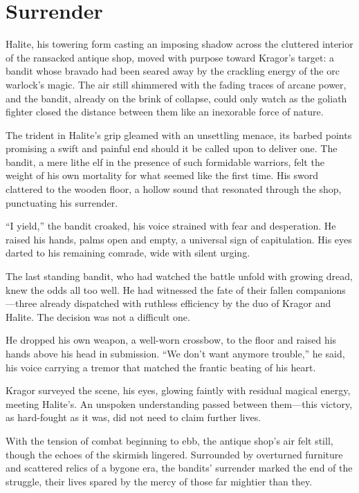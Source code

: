 \documentclass[
  12pt,twoside,twocolumn,openany,nodeprecatedcode]{dndbook}
\begin{document}
\section{Surrender}\label{surrender}

Halite, his towering form casting an imposing shadow across the
cluttered interior of the ransacked antique shop, moved with purpose
toward Kragor's target: a bandit whose bravado had been seared away by
the crackling energy of the orc warlock's magic. The air still shimmered
with the fading traces of arcane power, and the bandit, already on the
brink of collapse, could only watch as the goliath fighter closed the
distance between them like an inexorable force of nature.

The trident in Halite's grip gleamed with an unsettling menace, its
barbed points promising a swift and painful end should it be called upon
to deliver one. The bandit, a mere lithe elf in the presence of such
formidable warriors, felt the weight of his own mortality for what
seemed like the first time. His sword clattered to the wooden floor, a
hollow sound that resonated through the shop, punctuating his surrender.

``I yield,'' the bandit croaked, his voice strained with fear and
desperation. He raised his hands, palms open and empty, a universal sign
of capitulation. His eyes darted to his remaining comrade, wide with
silent urging.

The last standing bandit, who had watched the battle unfold with growing
dread, knew the odds all too well. He had witnessed the fate of their
fallen companions---three already dispatched with ruthless efficiency by
the duo of Kragor and Halite. The decision was not a difficult one.

He dropped his own weapon, a well-worn crossbow, to the floor and raised
his hands above his head in submission. ``We don't want anymore
trouble,'' he said, his voice carrying a tremor that matched the frantic
beating of his heart.

Kragor surveyed the scene, his eyes, glowing faintly with residual
magical energy, meeting Halite's. An unspoken understanding passed
between them---this victory, as hard-fought as it was, did not need to
claim further lives.

With the tension of combat beginning to ebb, the antique shop's air felt
still, though the echoes of the skirmish lingered. Surrounded by
overturned furniture and scattered relics of a bygone era, the bandits'
surrender marked the end of the struggle, their lives spared by the
mercy of those far mightier than they.
\end{document}
